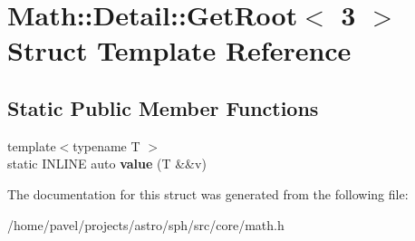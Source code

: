\hypertarget{structMath_1_1Detail_1_1GetRoot_3_013_01_4}{}\section{Math\+:\+:Detail\+:\+:Get\+Root$<$ 3 $>$ Struct Template Reference}
\label{structMath_1_1Detail_1_1GetRoot_3_013_01_4}
\subsection*{Static Public Member Functions}
\begin{DoxyCompactItemize}
\item 
\hypertarget{structMath_1_1Detail_1_1GetRoot_3_013_01_4_a81f6fd0b78824693608e73ab506fd6a6}{}\label{structMath_1_1Detail_1_1GetRoot_3_013_01_4_a81f6fd0b78824693608e73ab506fd6a6} 
{\footnotesize template$<$typename T $>$ }\\static I\+N\+L\+I\+NE auto {\bfseries value} (T \&\&v)
\end{DoxyCompactItemize}


The documentation for this struct was generated from the following file\+:\begin{DoxyCompactItemize}
\item 
/home/pavel/projects/astro/sph/src/core/math.\+h\end{DoxyCompactItemize}
